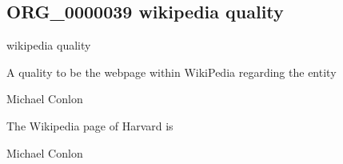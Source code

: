 \documentclass[letterpaper,10pt,english]{sphinxmanual}
\begin{document}
\subsection{ORG\_0000039 \sphinxhyphen{} wikipedia quality}
\label{\detokenize{doc-ORG_0000039:org-0000039-wikipedia-quality}}\label{\detokenize{doc-ORG_0000039:index-0}}\label{\detokenize{doc-ORG_0000039::doc}}
\begin{sphinxShadowBox}

\sphinxAtStartPar
wikipedia quality
\end{sphinxShadowBox}

\begin{sphinxShadowBox}

\sphinxAtStartPar
{\hyperref[\detokenize{doc-BFO_0000019::doc}]{}}
\end{sphinxShadowBox}

\begin{sphinxShadowBox}

\sphinxAtStartPar
A quality to be the webpage within WikiPedia regarding the entity
\end{sphinxShadowBox}

\begin{sphinxShadowBox}

\sphinxAtStartPar
Michael Conlon 
\end{sphinxShadowBox}

\begin{sphinxShadowBox}

\sphinxAtStartPar
The Wikipedia page of Harvard is 
\end{sphinxShadowBox}

\begin{sphinxShadowBox}

\sphinxAtStartPar
Michael Conlon 
\end{sphinxShadowBox}
\begin{quote}

\ignorespaces \end{quote}
\end{document}

